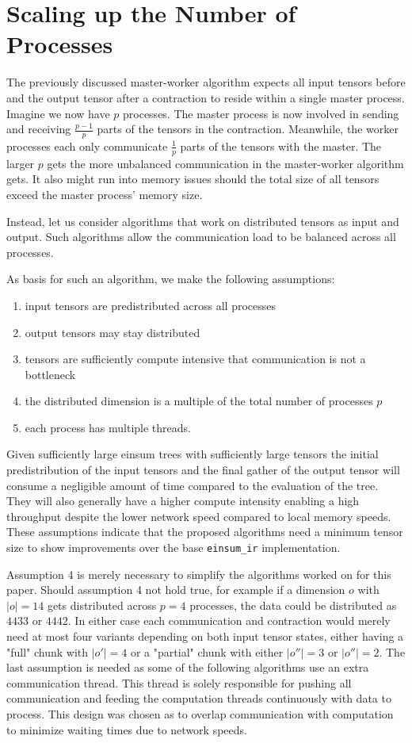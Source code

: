 \section{Scaling up the Number of Processes}
\label{sec:n_nodes}

The previously discussed master-worker algorithm expects all input tensors before and the output tensor after a contraction to reside within a single master process.
Imagine we now have $p$ processes.
The master process is now involved in sending and receiving $\frac{p-1}{p}$ parts of the tensors in the contraction.
Meanwhile, the worker processes each only communicate $\frac{1}{p}$ parts of the tensors with the master.
The larger $p$ gets the more unbalanced communication in the master-worker algorithm gets.
It also might run into memory issues should the total size of all tensors exceed the master process' memory size.

Instead, let us consider algorithms that work on distributed tensors as input and output.
Such algorithms allow the communication load to be balanced across all processes.

As basis for such an algorithm, we make the following assumptions:
\begin{enumerate}
    \item input tensors are predistributed across all processes
    \item output tensors may stay distributed
    \item tensors are sufficiently compute intensive that communication is not a bottleneck
    \item the distributed dimension is a multiple of the total number of processes $p$
    \item each process has multiple threads.
\end{enumerate}

Given sufficiently large einsum trees with sufficiently large tensors the initial predistribution of the input tensors and the final gather of the output tensor will consume a negligible amount of time compared to the evaluation of the tree.
They will also generally have a higher compute intensity enabling a high throughput despite the lower network speed compared to local memory speeds.
These assumptions indicate that the proposed algorithms need a minimum tensor size to show improvements over the base \texttt{einsum\_ir} implementation.

Assumption 4 is merely necessary to simplify the algorithms worked on for this paper.
Should assumption 4 not hold true, for example if a dimension $o$ with $|o|=14$ gets distributed across $p=4$ processes, the data could be distributed as $4 4 3 3$ or $4 4 4 2$.
In either case each communication and contraction would merely need at most four variants depending on both input tensor states, either having a "full" chunk with $|o'|=4$ or a "partial" chunk with either $|o''|=3$ or $|o''|=2$.
The last assumption is needed as some of the following algorithms use an extra communication thread.
This thread is solely responsible for pushing all communication and feeding the computation threads continuously with data to process.
This design was chosen as to overlap communication with computation to minimize waiting times due to network speeds.

